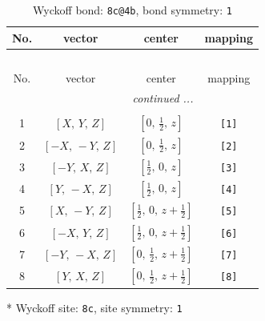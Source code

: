 \documentclass[fleqn,8pt]{jsarticle}
\begin{document}
\renewcommand{\arraystretch}{1.2}
\begin{longtable}{cccc}
\caption{Wyckoff bond: {\tt 8c@4b}, bond symmetry: {\tt 1}}
 \\
 \hline \hline
No. & vector & center & mapping \\ \hline \endfirsthead

\multicolumn{3}{l}{\tablename\ \thetable{}} \\
 \hline \hline
No. & vector & center & mapping \\ \hline \endhead

 \hline \hline
\multicolumn{3}{r}{\footnotesize\it continued ...} \\ \endfoot

 \hline \hline
\multicolumn{3}{r}{} \\ \endlastfoot

1 & $\left[ X,\, Y,\, Z \right]$ & $\left[ 0,\, \frac{1}{2},\, z \right]$ & {\tt [1]} \\ \hline
2 & $\left[ - X,\, - Y,\, Z \right]$ & $\left[ 0,\, \frac{1}{2},\, z \right]$ & {\tt [2]} \\ \hline
3 & $\left[ - Y,\, X,\, Z \right]$ & $\left[ \frac{1}{2},\, 0,\, z \right]$ & {\tt [3]} \\ \hline
4 & $\left[ Y,\, - X,\, Z \right]$ & $\left[ \frac{1}{2},\, 0,\, z \right]$ & {\tt [4]} \\ \hline
5 & $\left[ X,\, - Y,\, Z \right]$ & $\left[ \frac{1}{2},\, 0,\, z + \frac{1}{2} \right]$ & {\tt [5]} \\ \hline
6 & $\left[ - X,\, Y,\, Z \right]$ & $\left[ \frac{1}{2},\, 0,\, z + \frac{1}{2} \right]$ & {\tt [6]} \\ \hline
7 & $\left[ - Y,\, - X,\, Z \right]$ & $\left[ 0,\, \frac{1}{2},\, z + \frac{1}{2} \right]$ & {\tt [7]} \\ \hline
8 & $\left[ Y,\, X,\, Z \right]$ & $\left[ 0,\, \frac{1}{2},\, z + \frac{1}{2} \right]$ & {\tt [8]} \\
\end{longtable}
* Wyckoff site: {\tt 8c}, site symmetry: {\tt 1}
\renewcommand{\arraystretch}{1.2}
\end{document}
